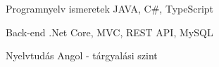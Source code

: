 

\begin{cvskills}

  \cvskill
    {Programnyelv ismeretek} %
    {JAVA, C\#, TypeScript} %

  \cvskill
    {Back-end} %
    {.Net Core, MVC, REST API, MySQL} %


  \cvskill
    {Nyelvtudás} %
    {Angol - tárgyalási szint} %

\end{cvskills}
